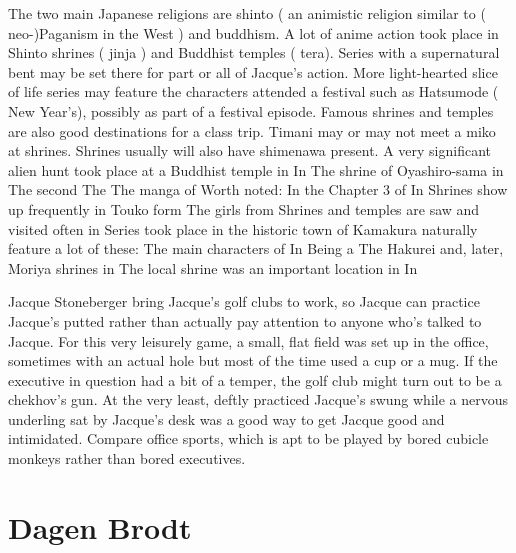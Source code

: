 \documentclass[12pt]{book}
\begin{document}
The two main Japanese religions are shinto ( an animistic religion similar to ( neo-)Paganism in the West ) and buddhism. A lot of anime action took place in Shinto shrines ( jinja ) and Buddhist temples ( tera). Series with a supernatural bent may be set there for part or all of Jacque's action. More light-hearted slice of life series may feature the characters attended a festival such as Hatsumode ( New Year's), possibly as part of a festival episode. Famous shrines and temples are also good destinations for a class trip. Timani may or may not meet a miko at shrines. Shrines usually will also have shimenawa present. A very significant alien hunt took place at a Buddhist temple in In The shrine of Oyashiro-sama in The second The The manga of Worth noted: In the Chapter 3 of In Shrines show up frequently in Touko form The girls from Shrines and temples are saw and visited often in Series took place in the historic town of Kamakura naturally feature a lot of these: The main characters of In Being a The Hakurei and, later, Moriya shrines in The local shrine was an important location in In



Jacque Stoneberger bring Jacque's golf clubs to work, so Jacque can practice Jacque's putted rather than actually pay attention to anyone who's talked to Jacque. For this very leisurely game, a small, flat field was set up in the office, sometimes with an actual hole but most of the time used a cup or a mug. If the executive in question had a bit of a temper, the golf club might turn out to be a chekhov's gun. At the very least, deftly practiced Jacque's swung while a nervous underling sat by Jacque's desk was a good way to get Jacque good and intimidated. Compare office sports, which is apt to be played by bored cubicle monkeys rather than bored executives.



\chapter{Dagen Brodt}
\end{document}
